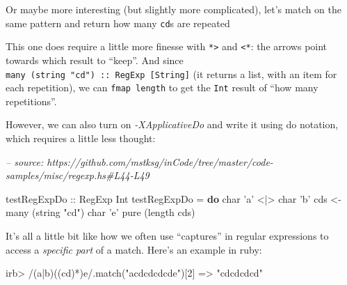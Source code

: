 \documentclass[]{article}
\newenvironment{Shaded}{}{}
\newcommand{\CharTok}[1]{\textcolor[rgb]{0.25,0.44,0.63}{#1}}
\newcommand{\CommentTok}[1]{\textcolor[rgb]{0.38,0.63,0.69}{\textit{#1}}}
\newcommand{\DataTypeTok}[1]{\textcolor[rgb]{0.56,0.13,0.00}{#1}}
\newcommand{\DecValTok}[1]{\textcolor[rgb]{0.25,0.63,0.44}{#1}}
\newcommand{\FunctionTok}[1]{\textcolor[rgb]{0.02,0.16,0.49}{#1}}
\newcommand{\KeywordTok}[1]{\textcolor[rgb]{0.00,0.44,0.13}{\textbf{#1}}}
\newcommand{\NormalTok}[1]{#1}
\newcommand{\OtherTok}[1]{\textcolor[rgb]{0.00,0.44,0.13}{#1}}
\newcommand{\StringTok}[1]{\textcolor[rgb]{0.25,0.44,0.63}{#1}}
\begin{document}
Or maybe more interesting (but slightly more complicated), let's match on the
same pattern and return how many \texttt{cd}s are repeated

\begin{Shaded}
\end{Shaded}

This one does require a little more finesse with \texttt{*\textgreater{}} and
\texttt{\textless{}*}: the arrows point towards which result to ``keep''. And
since \texttt{many\ (string\ "cd")\ ::\ RegExp\ {[}String{]}} (it returns a
list, with an item for each repetition), we can \texttt{fmap\ length} to get the
\texttt{Int} result of ``how many repetitions''.

However, we can also turn on \emph{-XApplicativeDo} and write it using do
notation, which requires a little less thought:

\begin{Shaded}
\begin{Highlighting}[]
\CommentTok{-- source: https://github.com/mstksg/inCode/tree/master/code-samples/misc/regexp.hs#L44-L49}

\OtherTok{testRegExpDo ::} \DataTypeTok{RegExp} \DataTypeTok{Int}
\NormalTok{testRegExpDo }\FunctionTok{=} \KeywordTok{do}
\NormalTok{    char }\CharTok{'a'} \FunctionTok{<|>}\NormalTok{ char }\CharTok{'b'}
\NormalTok{    cds }\OtherTok{<-}\NormalTok{ many (string }\StringTok{"cd"}\NormalTok{)}
\NormalTok{    char }\CharTok{'e'}
    \FunctionTok{pure}\NormalTok{ (}\FunctionTok{length}\NormalTok{ cds)}
\end{Highlighting}
\end{Shaded}

It's all a little bit like how we often use ``captures'' in regular expressions
to access a \emph{specific part} of a match. Here's an example in ruby:

\begin{Shaded}
\begin{Highlighting}[]
\NormalTok{irb> }\OtherTok{/(a|b)((cd)*)e/}\NormalTok{.match(}\StringTok{"acdcdcdcde"}\NormalTok{)[}\DecValTok{2}\NormalTok{]}
\NormalTok{=> }\StringTok{"cdcdcdcd"}
\end{Highlighting}
\end{Shaded}
\end{document}
